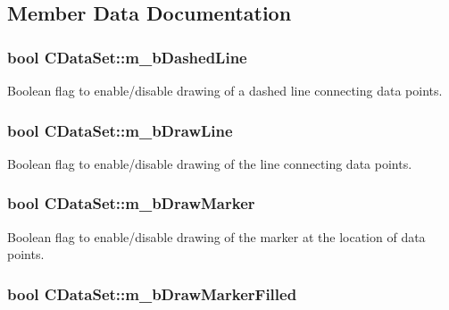\subsection{Member Data Documentation}
\hypertarget{class_c_data_set_a970c9a88bec57e1b2a1e006ea8ae8d93}{
\subsubsection[{m\-\_\-b\-Dashed\-Line}]{\setlength{\rightskip}{0pt plus 5cm}bool C\-Data\-Set\-::m\-\_\-b\-Dashed\-Line\hspace{0.3cm}{\ttfamily [protected]}}}\label{class_c_data_set_a970c9a88bec57e1b2a1e006ea8ae8d93}
Boolean flag to enable/disable drawing of a dashed line connecting data points. \hypertarget{class_c_data_set_a963836e5f4a29dcd139394107c898b1d}{
\subsubsection[{m\-\_\-b\-Draw\-Line}]{\setlength{\rightskip}{0pt plus 5cm}bool C\-Data\-Set\-::m\-\_\-b\-Draw\-Line\hspace{0.3cm}{\ttfamily [protected]}}}\label{class_c_data_set_a963836e5f4a29dcd139394107c898b1d}
Boolean flag to enable/disable drawing of the line connecting data points. \hypertarget{class_c_data_set_a6f90306deeec7d4d564673d3ee45e969}{
\subsubsection[{m\-\_\-b\-Draw\-Marker}]{\setlength{\rightskip}{0pt plus 5cm}bool C\-Data\-Set\-::m\-\_\-b\-Draw\-Marker\hspace{0.3cm}{\ttfamily [protected]}}}\label{class_c_data_set_a6f90306deeec7d4d564673d3ee45e969}
Boolean flag to enable/disable drawing of the marker at the location of data points. \hypertarget{class_c_data_set_ac235794523914f43b48b2ba13e6395a6}{
\subsubsection[{m\-\_\-b\-Draw\-Marker\-Filled}]{\setlength{\rightskip}{0pt plus 5cm}bool C\-Data\-Set\-::m\-\_\-b\-Draw\-Marker\-Filled\hspace{0.3cm}{\ttfamily [protected]}}}\label{class_c_data_set_ac235794523914f43b48b2ba13e6395a6}
